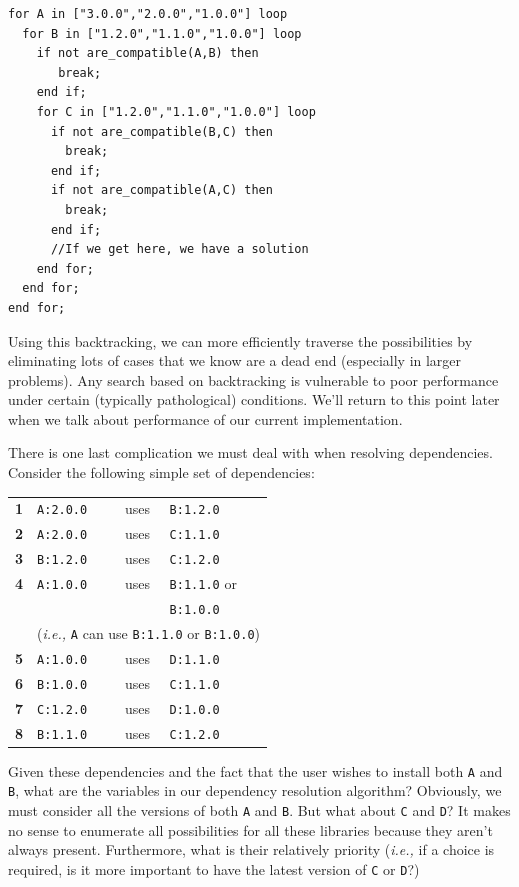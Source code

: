 \documentclass[11pt,a4paper,twocolumn]{article}
\renewcommand{\small}{\fontsize{9.5pt}{11.1pt}\selectfont}
\newcommand{\code}[1]{\texttt{#1}} %
\begin{document}
{\small
\begin{verbatim}
for A in ["3.0.0","2.0.0","1.0.0"] loop
  for B in ["1.2.0","1.1.0","1.0.0"] loop
    if not are_compatible(A,B) then
       break;
    end if;
    for C in ["1.2.0","1.1.0","1.0.0"] loop
      if not are_compatible(B,C) then
        break;
      end if;
      if not are_compatible(A,C) then
        break;
      end if;
      //If we get here, we have a solution
    end for;
  end for;
end for;
\end{verbatim}
}

Using this backtracking, we can more efficiently traverse the
possibilities by eliminating lots of cases that we know are a dead
end (especially in larger problems).  Any search based on backtracking
is vulnerable to poor performance under certain (typically
pathological) conditions.  We'll return to this point later when we
talk about performance of our current implementation.

There is one last complication we must deal with when resolving
dependencies.  Consider the following simple set of dependencies:
{\small
\begin{center}
\begin{tabular}{llcl}
  \textbf{1} &\code{A:2.0.0} &uses &\code{B:1.2.0}\\
  \textbf{2} &\code{A:2.0.0} &uses &\code{C:1.1.0}\\
  \textbf{3} &\code{B:1.2.0} &uses &\code{C:1.2.0}\\
  \textbf{4} &\code{A:1.0.0} &uses &\code{B:1.1.0} or\\
             &               &     &\code{B:1.0.0} \\
             & \multicolumn{3}{c}{(\emph{i.e.,} \code{A} can use \code{B:1.1.0} or \code{B:1.0.0})}\\
  \textbf{5} &\code{A:1.0.0} &uses &\code{D:1.1.0}\\
  \textbf{6} &\code{B:1.0.0} &uses &\code{C:1.1.0}\\
  \textbf{7} &\code{C:1.2.0} &uses &\code{D:1.0.0}\\
  \textbf{8} &\code{B:1.1.0} &uses &\code{C:1.2.0}
\end{tabular}
\end{center}
}
Given these dependencies and the fact that the user wishes to install
both \code{A} and \code{B}, what are the variables in our dependency
resolution algorithm?  Obviously, we must consider all the versions of
both \code{A} and \code{B}.  But what about \code{C} and \code{D}?
It makes no sense to enumerate all possibilities for all these
libraries because they aren't always present.  Furthermore, what is
their relatively priority (\emph{i.e.,} if a choice is required, is it
more important to have the latest version of \code{C} or \code{D}?)
\end{document}
